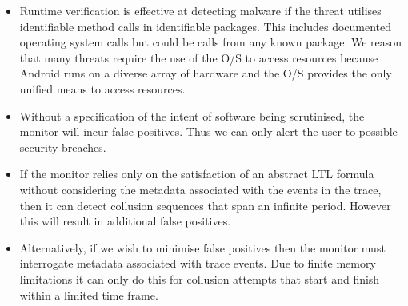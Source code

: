 \begin{itemize}

\item Runtime verification is effective at detecting malware if the threat utilises identifiable method calls in identifiable packages.  This includes documented operating system calls but could be calls from any known package.  We reason that many threats require the use of the O/S to access resources because Android runs on a diverse array of hardware and the O/S provides the only unified means to access resources.

\item Without a specification of the intent of software being scrutinised, the monitor will incur false positives.  Thus we can only alert the user to possible security breaches.

\item If the monitor relies only on the satisfaction of an abstract LTL formula without considering the metadata associated with the events in the trace, then it can detect collusion sequences that span an infinite period.  However this will result in additional false positives.

\item Alternatively, if we wish to minimise false positives then the monitor must interrogate metadata associated with trace events.  Due to finite memory limitations it can only do this for collusion attempts that start and finish within a limited time frame.

\end{itemize}

